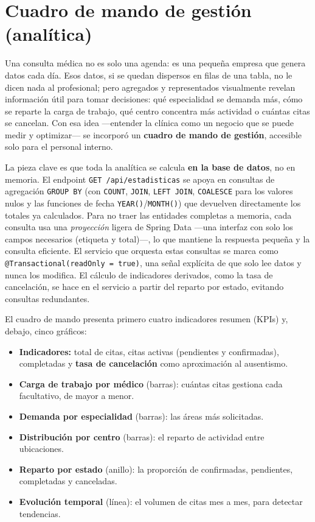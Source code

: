 \documentclass[12pt,a4paper]{report}
\begin{document}
\section{Cuadro de mando de gestión (analítica)}

Una consulta médica no es solo una agenda: es una pequeña empresa que genera datos cada día. Esos datos, si se quedan dispersos en filas de una tabla, no le dicen nada al profesional; pero agregados y representados visualmente revelan información útil para tomar decisiones: qué especialidad se demanda más, cómo se reparte la carga de trabajo, qué centro concentra más actividad o cuántas citas se cancelan. Con esa idea —entender la clínica como un negocio que se puede medir y optimizar— se incorporó un \textbf{cuadro de mando de gestión}, accesible solo para el personal interno.

La pieza clave es que toda la analítica se calcula \textbf{en la base de datos}, no en memoria. El endpoint \texttt{GET /api/estadisticas} se apoya en consultas de agregación \texttt{GROUP BY} (con \texttt{COUNT}, \texttt{JOIN}, \texttt{LEFT JOIN}, \texttt{COALESCE} para los valores nulos y las funciones de fecha \texttt{YEAR()}/\texttt{MONTH()}) que devuelven directamente los totales ya calculados. Para no traer las entidades completas a memoria, cada consulta usa una \emph{proyección} ligera de Spring Data —una interfaz con solo los campos necesarios (etiqueta y total)—, lo que mantiene la respuesta pequeña y la consulta eficiente. El servicio que orquesta estas consultas se marca como \texttt{@Transactional(readOnly = true)}, una señal explícita de que solo lee datos y nunca los modifica. El cálculo de indicadores derivados, como la tasa de cancelación, se hace en el servicio a partir del reparto por estado, evitando consultas redundantes.

El cuadro de mando presenta primero cuatro indicadores resumen (KPIs) y, debajo, cinco gráficos:

\begin{itemize}
  \item \textbf{Indicadores:} total de citas, citas activas (pendientes y confirmadas), completadas y \textbf{tasa de cancelación} como aproximación al ausentismo.
  \item \textbf{Carga de trabajo por médico} (barras): cuántas citas gestiona cada facultativo, de mayor a menor.
  \item \textbf{Demanda por especialidad} (barras): las áreas más solicitadas.
  \item \textbf{Distribución por centro} (barras): el reparto de actividad entre ubicaciones.
  \item \textbf{Reparto por estado} (anillo): la proporción de confirmadas, pendientes, completadas y canceladas.
  \item \textbf{Evolución temporal} (línea): el volumen de citas mes a mes, para detectar tendencias.
\end{itemize}
\end{document}

